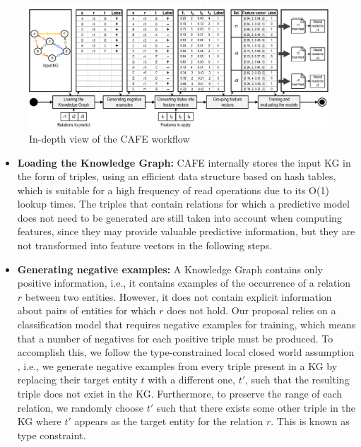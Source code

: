 \begin{figure}[htp]
    \centering
    \includegraphics[width=\textwidth]{fig/cafe/workflow}
    \caption{In-depth view of the CAFE workflow}
    \label{fig:workflow-cafe}
\end{figure}

\begin{itemize}
    \item \textbf{Loading the Knowledge Graph:} CAFE internally stores the input KG in the form of \triple{} triples, using an efficient data structure based on hash tables, which is suitable for a high frequency of read operations due to its O(1) lookup times. The triples that contain relations for which a predictive model does not need to be generated are still taken into account when computing features, since they may provide valuable predictive information, but they are not transformed into feature vectors in the following steps.\\
    
    \item \textbf{Generating negative examples:} A Knowledge Graph contains only positive information, i.e., it contains examples of the occurrence of a relation $r$ between two entities. However, it does not contain explicit information about pairs of entities for which $r$ does not hold. Our proposal relies on a classification model that requires negative examples for training, which means that a number of negatives for each positive triple must be produced. To accomplish this, we follow the type-constrained local closed world assumption \cite{bansal2020negatives}, i.e., we generate negative examples from every triple \triple{} present in a KG by replacing their target entity $t$ with a different one, $t'$, such that the resulting triple \negtriple{} does not exist in the KG. Furthermore, to preserve the range of each relation, we randomly choose $t'$ such that there exists some other triple in the KG where $t'$ appears as the target entity for the relation $r$. This is known as type constraint.\\


\end{itemize}
